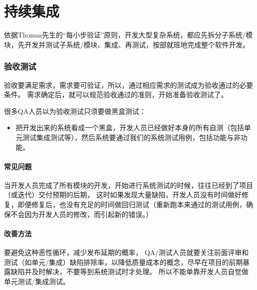 \chapter{持续集成} %

依据Thomas先生的``每小步验证''原则，开发大型复杂系统，都应先拆分子系统/模块，先开发并测试子系统/模块、集成、再测试，按部就班地完成整个软件开发。

\hypertarget{ux9a8cux6536ux6d4bux8bd5}{%
\subsection{验收测试}\label{ux9a8cux6536ux6d4bux8bd5}}

验收要满足需求，需求要可验证，所以，通过相应需求的测试成为验收通过的必要条件。
需求确定后，就可以规范验收通过的准则，开始准备验收测试了。

很多QA人员以为验收测试只须要做黑盒测试：

\begin{itemize}
\tightlist
\item
  把开发出来的系统看成一个黑盒，开发人员已经做好本身的所有自测（包括单元测试集成测试等），然后系统要通过我们的系统测试用例，包括功能与非功能。
\end{itemize}

\hypertarget{ux5e38ux89c1ux95eeux9898}{%
\subsubsection{常见问题}\label{ux5e38ux89c1ux95eeux9898}}

当开发人员完成了所有模块的开发，开始进行系统测试的时候，往往已经到了项目（或迭代）交付预期的后期，
这时如果发现大量缺陷，开发人员没有时间做好修复，即便修复后，也没有充足的时间做回归测试（重新跑本来通过的测试用例，确保不会因为开发人员的修改，而引起新的错误。）

\hypertarget{ux6539ux5584ux65b9ux6cd5}{%
\subsubsection{改善方法}\label{ux6539ux5584ux65b9ux6cd5}}

要避免这种恶性循环，减少发布延期的概率，
QA/测试人员就要关注前面评审和测试（如单元/集成）缺陷排除率，以降低质量成本的概念，尽早在项目的前期暴露缺陷并及时解决，不要等到系统测试时才处理。
所以不能单靠开发人员自觉做单元测试/集成测试。


